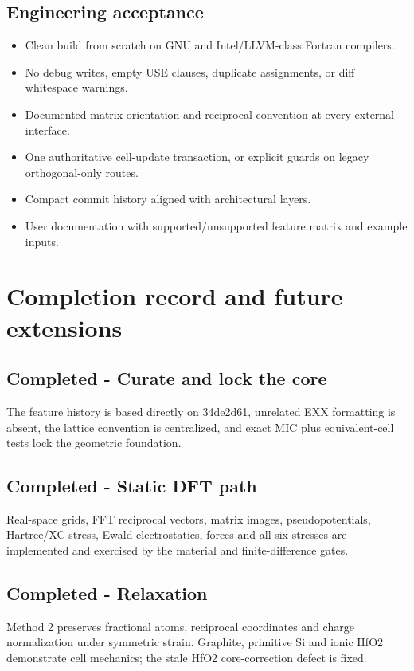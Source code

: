 \documentclass[10pt,a4paper]{report}
\begin{document}
\section{Engineering acceptance}
\begin{itemize}
\item Clean build from scratch on GNU and Intel/LLVM-class Fortran compilers.
\item No debug writes, empty USE clauses, duplicate assignments, or diff whitespace warnings.
\item Documented matrix orientation and reciprocal convention at every external interface.
\item One authoritative cell-update transaction, or explicit guards on legacy orthogonal-only routes.
\item Compact commit history aligned with architectural layers.
\item User documentation with supported/unsupported feature matrix and example inputs.
\end{itemize}
\chapter{Completion record and future extensions}
\section{Completed - Curate and lock the core}
The feature history is based directly on 34de2d61, unrelated EXX formatting is absent, the lattice convention is centralized, and exact MIC plus equivalent-cell tests lock the geometric foundation.

\section{Completed - Static DFT path}
Real-space grids, FFT reciprocal vectors, matrix images, pseudopotentials, Hartree/XC stress, Ewald electrostatics, forces and all six stresses are implemented and exercised by the material and finite-difference gates.

\section{Completed - Relaxation}
Method 2 preserves fractional atoms, reciprocal coordinates and charge normalization under symmetric strain. Graphite, primitive Si and ionic HfO2 demonstrate cell mechanics; the stale HfO2 core-correction defect is fixed.
\end{document}
